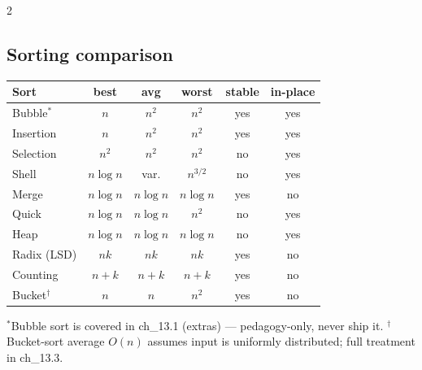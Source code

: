 \documentclass[10pt]{article}
\begin{document}
\begin{multicols}{2}
\subsection*{Sorting comparison}
\begin{tabular}{@{}l|ccc|cc@{}}
\textbf{Sort}        & \textbf{best}     & \textbf{avg}      & \textbf{worst}    & \textbf{stable} & \textbf{in-place}\\
\hline
Bubble$^\ast$        & $n$               & $n^2$             & $n^2$             & yes             & yes\\
Insertion            & $n$               & $n^2$             & $n^2$             & yes             & yes\\
Selection            & $n^2$             & $n^2$             & $n^2$             & no              & yes\\
Shell                & $n \log n$        & var.              & $n^{3/2}$         & no              & yes\\
Merge                & $n \log n$        & $n \log n$        & $n \log n$        & yes             & no\\
Quick                & $n \log n$        & $n \log n$        & $n^2$             & no              & yes\\
Heap                 & $n \log n$        & $n \log n$        & $n \log n$        & no              & yes\\
Radix (LSD)          & $nk$              & $nk$              & $nk$              & yes             & no\\
Counting             & $n{+}k$           & $n{+}k$           & $n{+}k$           & yes             & no\\
Bucket$^\dagger$     & $n$               & $n$               & $n^2$             & yes             & no
\end{tabular}

\smallskip
$^\ast$Bubble sort is covered in ch\_13.1 (extras) — pedagogy-only,
never ship it. $^\dagger$Bucket-sort average $O(n)$ assumes input is
uniformly distributed; full treatment in ch\_13.3.


\end{multicols}
\end{document}
